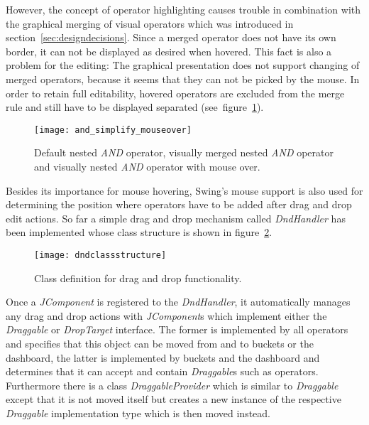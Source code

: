 
However, the concept of operator highlighting causes trouble in combination with the graphical merging of visual operators which was introduced in section~\ref{sec:designdecisions}. Since a merged operator does not have its own border, it can not be displayed as desired when hovered. This fact is also a problem for the editing: The graphical presentation does not support changing of merged operators, because it seems that they can not be picked by the mouse.
In order to retain full editability, hovered operators are excluded from the merge rule and still have to be displayed separated (see~figure~\ref{fig:nested_and_mouseover}).
\begin{figure}[htbp]
  \centering
  \texttt{[image: and\_simplify\_mouseover]}
  \caption{Default nested \emph{AND} operator, visually merged nested \emph{AND} operator and visually nested \emph{AND} operator with mouse over.
  }
  \label{fig:nested_and_mouseover}
\end{figure}


Besides its importance for mouse hovering, Swing's mouse support is also used for determining the position where operators have to be added after drag and drop edit actions. So far
a simple drag and drop mechanism called \emph{DndHandler} has been implemented whose class structure is shown in figure~\ref{fig:dndclassstructure}.
\begin{figure}[htbp]
  \centering
  \texttt{[image: dndclassstructure]} 
  \caption{Class definition for drag and drop functionality.}
  \label{fig:dndclassstructure}
\end{figure}%
Once a \emph{JComponent} is registered to the \emph{DndHandler}, it automatically manages any drag and drop actions with \emph{JComponent}s which implement either the \emph{Draggable} or \emph{DropTarget} interface. The former is implemented by all operators and specifies that this object can be moved from and to buckets or the dashboard, the latter is implemented by buckets and the dashboard and determines that it can accept and contain \emph{Draggable}s such as operators.
Furthermore there is a class \emph{DraggableProvider} which is similar to \emph{Draggable} except that it is not moved itself but creates a new instance of the respective \emph{Draggable} implementation type which is then moved instead.

